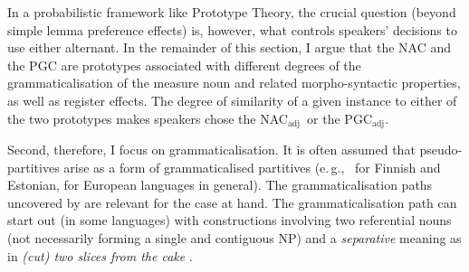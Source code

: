\documentclass[USenglish]{article}
\newcommand{\eg}{e.\,g.,}
\newcommand{\Sub}[1]{\ensuremath{\mathrm{_{#1}}}}
\newcommand{\NACa}{NAC\Sub{adj}}
\newcommand{\PGCa}{PGC\Sub{adj}}
\begin{document}

In a probabilistic framework like Prototype Theory, the crucial question (beyond simple lemma preference effects) is, however, what controls speakers' decisions to use either alternant. 
In the remainder of this section, I argue that the NAC and the PGC are prototypes associated with different degrees of the grammaticalisation of the measure noun and related morpho-syntactic properties, as well as register effects.
The degree of similarity of a given instance to either of the two prototypes makes speakers chose the \NACa\ or the \PGCa.

Second, therefore, I focus on grammaticalisation.
It is often assumed that pseudo-partitives arise as a form of grammaticalised partitives (\eg\ \citealp[536--539]{Koptjevskaja2001} for Finnish and Estonian, \citealp[559]{Koptjevskaja2001} for European languages in general).
%
%
%
%
The grammaticalisation paths uncovered by \citet[esp.\ 526--530]{Koptjevskaja2001} are relevant for the case at hand.
The grammaticalisation path can start out (in some languages) with constructions involving two referential nouns (not necessarily forming a single and contiguous NP) and a \textit{separative} meaning as in \textit{(cut) two slices from the cake} \citep[535]{Koptjevskaja2001}.
\end{document}
